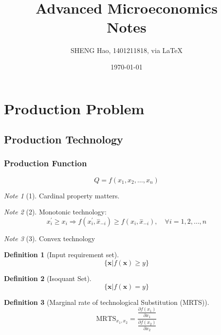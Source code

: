 \documentclass{article}
\theoremstyle{plain}
\theoremstyle{definition}
\newtheorem{defn}{Definition}[section]
\theoremstyle{remark}
\newtheorem*{note}{Note}
\begin{document}
\title{Advanced Microeconomics\\Notes}
\author{{\normalsize SHENG Hao, 1401211818, via \LaTeX}}
\date{\today}

\maketitle

\def \Pr{{\rm Pr}}
\baselineskip 0.6cm
\section{Production Problem}
\subsection{Production Technology}
\subsubsection{Production Function}
\begin{equation}
	Q = f(x_1,x_2,\dots,x_n)
\end{equation}
\begin{note}[1]
Cardinal property matters.
\end{note}
\begin{note}[2]
Monotonic technology:
\begin{equation}
	x^{'}_i\geq x_i \Rightarrow f(x^{'}_i, \overset{-}x_{-i})\geq f(x_i, \overset{-}x_{-i}), \quad \forall i = 1, 2, \dots, n
\end{equation}
\end{note}
\begin{note}[3]
Convex technology 
\end{note}

\begin{defn}[Input requirement set]
\begin{equation}
	\{ \bm{x}|f(\bm{x}) \geq y \}
\end{equation}
\end{defn}

\begin{defn}[Isoquant Set]
\begin{equation}
	\{ \bm{x}|f(\bm{x}) = y \}
\end{equation}
\end{defn}

\begin{defn}[Marginal rate of technological Substitution (MRTS)]
\begin{equation}
	\text{MRTS}_{x_1,x_2}=\frac{\frac{\partial f(x_1)}{\partial x_1}}{\frac{\partial f(x_2)}{\partial x_2}}
\end{equation}
\end{defn}
\end{document}
